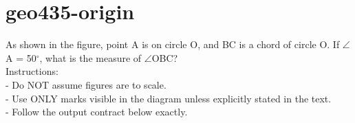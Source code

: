\documentclass[12pt]{article}
\begin{document}
\section*{geo435-origin}
\noindent\begin{minipage}{\textwidth}
\setlength{\parskip}{4pt}
As shown in the figure, point A is on circle O, and BC is a chord of circle O. If \ensuremath{\angle }A = 50\ensuremath{^\circ}, what is the measure of \ensuremath{\angle }OBC?\\
Instructions:\\
- Do NOT assume figures are to scale.\\
- Use ONLY marks visible in the diagram unless explicitly stated in the text.\\
- Follow the output contract below exactly.\\
\end{minipage}
\end{document}
